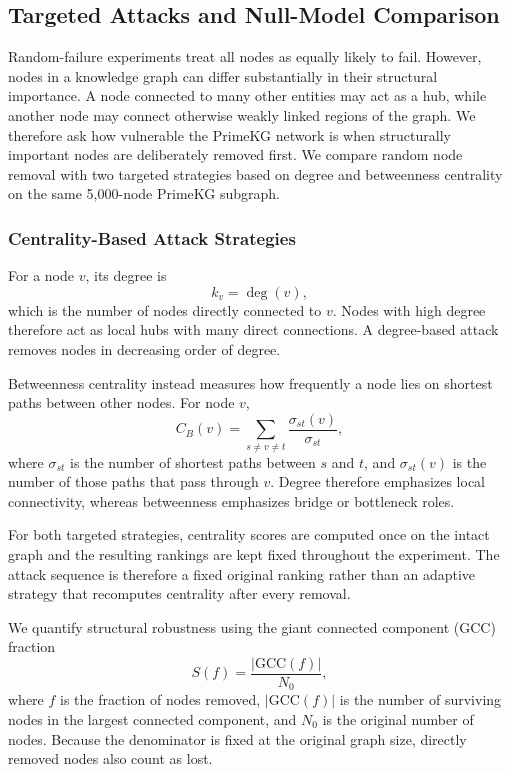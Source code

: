 \subsection{Targeted Attacks and Null-Model Comparison}
\label{sec:targeted-attacks}

Random-failure experiments treat all nodes as equally likely to fail. However, nodes in a knowledge graph can differ substantially in their structural importance. A node connected to many other entities may act as a hub, while another node may connect otherwise weakly linked regions of the graph. We therefore ask how vulnerable the PrimeKG network is when structurally important nodes are deliberately removed first. We compare random node removal with two targeted strategies based on degree and betweenness centrality on the same 5,000-node PrimeKG subgraph.

\subsubsection{Centrality-Based Attack Strategies}
For a node $v$, its degree is
\begin{equation}
    k_v = \deg(v),
\end{equation}
which is the number of nodes directly connected to $v$. Nodes with high degree therefore act as local hubs with many direct connections. A degree-based attack removes nodes in decreasing order of degree.

Betweenness centrality instead measures how frequently a node lies on shortest paths between other nodes. For node $v$,
\begin{equation}
C_B(v)=\sum_{s\neq v\neq t}\frac{\sigma_{st}(v)}{\sigma_{st}},
\end{equation}
where $\sigma_{st}$ is the number of shortest paths between $s$ and $t$, and $\sigma_{st}(v)$ is the number of those paths that pass through $v$. Degree therefore emphasizes local connectivity, whereas betweenness emphasizes bridge or bottleneck roles.

For both targeted strategies, centrality scores are computed once on the intact graph and the resulting rankings are kept fixed throughout the experiment. The attack sequence is therefore a fixed original ranking rather than an adaptive strategy that recomputes centrality after every removal.

We quantify structural robustness using the giant connected component (GCC) fraction
\begin{equation}
S(f)=\frac{|\mathrm{GCC}(f)|}{N_0},
\end{equation}
where $f$ is the fraction of nodes removed, $|\mathrm{GCC}(f)|$ is the number of surviving nodes in the largest connected component, and $N_0$ is the original number of nodes. Because the denominator is fixed at the original graph size, directly removed nodes also count as lost.

